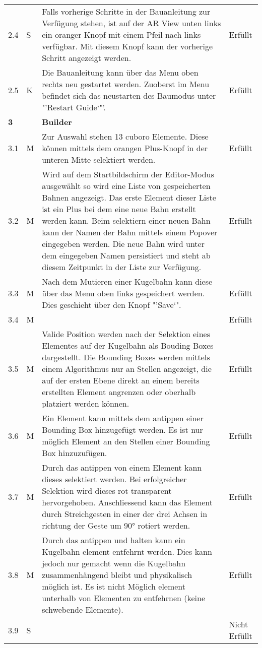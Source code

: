 \begin{longtable}{l l p{10cm} l}
	2.4 & S & Falls vorherige Schritte in der Bauanleitung zur Verfügung stehen, ist auf der AR View unten links ein oranger Knopf mit einem Pfeil nach links verfügbar. Mit diesem Knopf kann der vorherige Schritt angezeigt werden. & Erfüllt \\
	2.5 & K & Die Bauanleitung kann über das Menu oben rechts neu gestartet werden. Zuoberst im Menu befindet sich das neustarten des Baumodus unter "'Restart Guide`"'. & Erfüllt \\
	\hline
	\textbf{3} & & \textbf{Builder} & \\
	\hline
	3.1 & M & Zur Auswahl stehen 13 cuboro Elemente. Diese können mittels dem orangen Plus-Knopf in der unteren Mitte selektiert werden. & Erfüllt \\
	3.2 & M & Wird auf dem Startbildschirm der Editor-Modus ausgewählt so wird eine Liste von gespeicherten Bahnen angezeigt. Das erste Element dieser Liste ist ein Plus bei dem eine neue Bahn erstellt werden kann. Beim selektiern einer neuen Bahn kann der Namen der Bahn mittels einem Popover eingegeben werden. Die neue Bahn wird unter dem eingegeben Namen persistiert und steht ab diesem Zeitpunkt in der Liste zur Verfügung. & Erfüllt \\
	3.3 & M & Nach dem Mutieren einer Kugelbahn kann diese über das Menu oben links gespeichert werden. Dies geschieht über den Knopf "'Save`". & Erfüllt \\
	3.4 & M & & Erfüllt \\
	3.5 & M & Valide Position werden nach der Selektion eines Elementes auf der Kugelbahn als Bouding Boxes dargestellt. Die Bounding Boxes werden mittels einem Algorithmus nur an Stellen angezeigt, die auf der ersten Ebene direkt an einem bereits erstellten Element angrenzen oder oberhalb platziert werden können. & Erfüllt \\
	3.6 & M & Ein Element kann mittels dem antippen einer Bounding Box hinzugefügt werden. Es ist nur möglich Element an den Stellen einer Bounding Box hinzuzufügen. & Erfüllt \\
	3.7 & M & Durch das antippen von einem Element kann dieses selektiert werden. Bei erfolgreicher Selektion wird dieses rot transparent hervorgehoben. Anschliessend kann das Element durch Streichgesten in einer der drei Achsen in richtung der Geste um 90° rotiert werden. & Erfüllt \\
	3.8 & M & Durch das antippen und halten kann ein Kugelbahn element entfehrnt werden. Dies kann jedoch nur gemacht wenn die Kugelbahn zusammenhängend bleibt und physikalisch möglich ist. Es ist nicht Möglich element unterhalb von Elementen zu entfehrnen (keine schwebende Elemente). & Erfüllt \\
	3.9 & S & & Nicht Erfüllt \\
\end{longtable}
